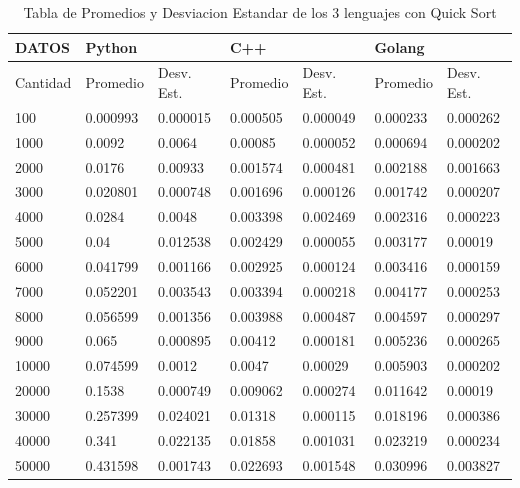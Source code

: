 \documentclass[12pt]{article} %
\begin{document}
\begin{table}[H]
    \def\arraystretch{1.3}
    \centering
    \begin{tabular}{|l|l|l|l|l|l|l|}
    \hline        
        DATOS & Python & ~ & C++ & ~ & Golang & ~ \\ \hline
        Cantidad & Promedio & Desv. Est. & Promedio & Desv. Est. & Promedio & Desv. Est. \\ \hline
        100 & 0.000993 & 0.000015 & 0.000505 & 0.000049 & 0.000233 & 0.000262 \\ \hline
        1000 & 0.0092 & 0.0064 & 0.00085 & 0.000052 & 0.000694 & 0.000202 \\ \hline
        2000 & 0.0176 & 0.00933 & 0.001574 & 0.000481 & 0.002188 & 0.001663 \\ \hline
        3000 & 0.020801 & 0.000748 & 0.001696 & 0.000126 & 0.001742 & 0.000207 \\ \hline
        4000 & 0.0284 & 0.0048 & 0.003398 & 0.002469 & 0.002316 & 0.000223 \\ \hline
        5000 & 0.04 & 0.012538 & 0.002429 & 0.000055 & 0.003177 & 0.00019 \\ \hline
        6000 & 0.041799 & 0.001166 & 0.002925 & 0.000124 & 0.003416 & 0.000159 \\ \hline
        7000 & 0.052201 & 0.003543 & 0.003394 & 0.000218 & 0.004177 & 0.000253 \\ \hline
        8000 & 0.056599 & 0.001356 & 0.003988 & 0.000487 & 0.004597 & 0.000297 \\ \hline
        9000 & 0.065 & 0.000895 & 0.00412 & 0.000181 & 0.005236 & 0.000265 \\ \hline
        10000 & 0.074599 & 0.0012 & 0.0047 & 0.00029 & 0.005903 & 0.000202 \\ \hline
        20000 & 0.1538 & 0.000749 & 0.009062 & 0.000274 & 0.011642 & 0.00019 \\ \hline
        30000 & 0.257399 & 0.024021 & 0.01318 & 0.000115 & 0.018196 & 0.000386 \\ \hline
        40000 & 0.341 & 0.022135 & 0.01858 & 0.001031 & 0.023219 & 0.000234 \\ \hline
        50000 & 0.431598 & 0.001743 & 0.022693 & 0.001548 & 0.030996 & 0.003827 \\ \hline
    \end{tabular}
    \caption{Tabla de Promedios y Desviacion Estandar de los 3 lenguajes con Quick Sort}
\end{table}

\vspace{10cm}
\end{document}
